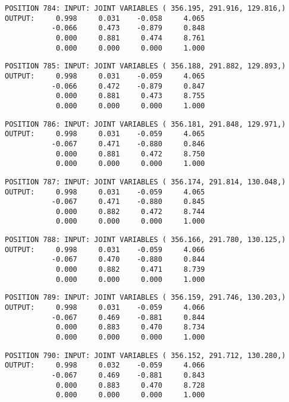 \begin{verbatim}
POSITION 784: INPUT: JOINT VARIABLES ( 356.195, 291.916, 129.816,)
OUTPUT:     0.998     0.031    -0.058     4.065
           -0.066     0.473    -0.879     0.848
            0.000     0.881     0.474     8.761
            0.000     0.000     0.000     1.000
\end{verbatim} \pagebreak[1]\begin{verbatim}
POSITION 785: INPUT: JOINT VARIABLES ( 356.188, 291.882, 129.893,)
OUTPUT:     0.998     0.031    -0.059     4.065
           -0.066     0.472    -0.879     0.847
            0.000     0.881     0.473     8.755
            0.000     0.000     0.000     1.000
\end{verbatim} \pagebreak[1]\begin{verbatim}
POSITION 786: INPUT: JOINT VARIABLES ( 356.181, 291.848, 129.971,)
OUTPUT:     0.998     0.031    -0.059     4.065
           -0.067     0.471    -0.880     0.846
            0.000     0.881     0.472     8.750
            0.000     0.000     0.000     1.000
\end{verbatim} \pagebreak[1]\begin{verbatim}
POSITION 787: INPUT: JOINT VARIABLES ( 356.174, 291.814, 130.048,)
OUTPUT:     0.998     0.031    -0.059     4.065
           -0.067     0.471    -0.880     0.845
            0.000     0.882     0.472     8.744
            0.000     0.000     0.000     1.000
\end{verbatim} \pagebreak[1]\begin{verbatim}
POSITION 788: INPUT: JOINT VARIABLES ( 356.166, 291.780, 130.125,)
OUTPUT:     0.998     0.031    -0.059     4.066
           -0.067     0.470    -0.880     0.844
            0.000     0.882     0.471     8.739
            0.000     0.000     0.000     1.000
\end{verbatim} \pagebreak[1]\begin{verbatim}
POSITION 789: INPUT: JOINT VARIABLES ( 356.159, 291.746, 130.203,)
OUTPUT:     0.998     0.031    -0.059     4.066
           -0.067     0.469    -0.881     0.844
            0.000     0.883     0.470     8.734
            0.000     0.000     0.000     1.000
\end{verbatim} \pagebreak[1]\begin{verbatim}
POSITION 790: INPUT: JOINT VARIABLES ( 356.152, 291.712, 130.280,)
OUTPUT:     0.998     0.032    -0.059     4.066
           -0.067     0.469    -0.881     0.843
            0.000     0.883     0.470     8.728
            0.000     0.000     0.000     1.000
\end{verbatim} \pagebreak[1]\begin{verbatim}

\end{verbatim}
